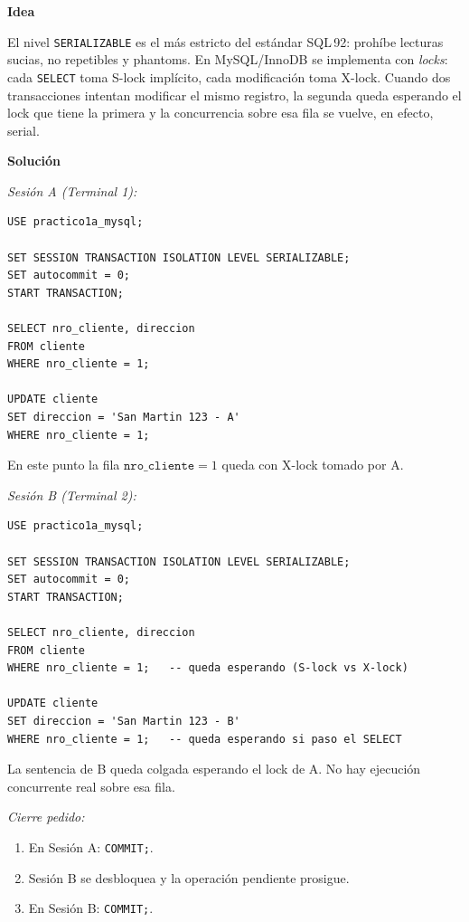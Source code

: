 \documentclass[11pt,a4paper]{article}
\newcommand{\itemcabecera}[1]{\noindent\textbf{#1}\par\medskip}
\newcommand{\bloqueIdea}{\itemcabecera{Idea}}
\newcommand{\bloqueSolucion}{\itemcabecera{Soluci\'on}}
\begin{document}
\bloqueIdea

El nivel \texttt{SERIALIZABLE} es el más estricto del estándar SQL\,92: prohíbe lecturas sucias, no repetibles y phantoms. En MySQL/InnoDB se implementa con \emph{locks}: cada \texttt{SELECT} toma S-lock implícito, cada modificación toma X-lock. Cuando dos transacciones intentan modificar el mismo registro, la segunda queda esperando el lock que tiene la primera y la concurrencia sobre esa fila se vuelve, en efecto, serial.

\bloqueSolucion

\textit{Sesión A (Terminal 1):}

\begin{lstlisting}
USE practico1a_mysql;

SET SESSION TRANSACTION ISOLATION LEVEL SERIALIZABLE;
SET autocommit = 0;
START TRANSACTION;

SELECT nro_cliente, direccion
FROM cliente
WHERE nro_cliente = 1;

UPDATE cliente
SET direccion = 'San Martin 123 - A'
WHERE nro_cliente = 1;
\end{lstlisting}

En este punto la fila $\texttt{nro\_cliente} = 1$ queda con X-lock tomado por A.

\textit{Sesión B (Terminal 2):}

\begin{lstlisting}
USE practico1a_mysql;

SET SESSION TRANSACTION ISOLATION LEVEL SERIALIZABLE;
SET autocommit = 0;
START TRANSACTION;

SELECT nro_cliente, direccion
FROM cliente
WHERE nro_cliente = 1;   -- queda esperando (S-lock vs X-lock)

UPDATE cliente
SET direccion = 'San Martin 123 - B'
WHERE nro_cliente = 1;   -- queda esperando si paso el SELECT
\end{lstlisting}

La sentencia de B queda colgada esperando el lock de A. No hay ejecución concurrente real sobre esa fila.

\textit{Cierre pedido:}

\begin{enumerate}
    \item En Sesión A: \texttt{COMMIT;}.
    \item Sesión B se desbloquea y la operación pendiente prosigue.
    \item En Sesión B: \texttt{COMMIT;}.
\end{enumerate}
\end{document}
